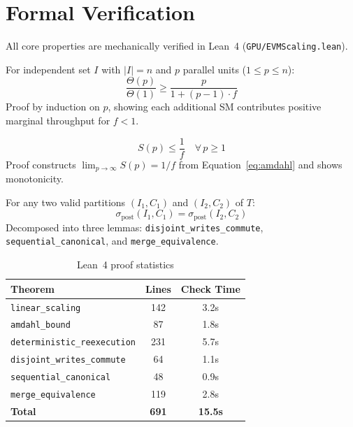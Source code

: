 \section{Formal Verification}

\label{sec:formal}

All core properties are mechanically verified in Lean~4 (\texttt{GPU/EVMScaling.lean}).

\begin{theorem}
\label{thm:formal-linear}
For independent set $I$ with $|I| = n$ and $p$ parallel units ($1 \leq p \leq n$):
\begin{equation}
\frac{\Theta(p)}{\Theta(1)} \geq \frac{p}{1 + (p-1) \cdot f}
\end{equation}
Proof by induction on $p$, showing each additional SM contributes positive marginal throughput for $f < 1$.
\end{theorem}

\begin{theorem}
\label{thm:formal-amdahl}
\begin{equation}
S(p) \leq \frac{1}{f} \quad \forall\, p \geq 1
\end{equation}
Proof constructs $\lim_{p \to \infty} S(p) = 1/f$ from Equation~\ref{eq:amdahl} and shows monotonicity.
\end{theorem}

\begin{theorem}
\label{thm:formal-deterministic}
For any two valid partitions $(I_1, C_1)$ and $(I_2, C_2)$ of $T$:
\begin{equation}
\sigma_{\text{post}}(I_1, C_1) = \sigma_{\text{post}}(I_2, C_2)
\end{equation}
Decomposed into three lemmas: \texttt{disjoint\_writes\_commute}, \texttt{sequential\_canonical}, and \texttt{merge\_equivalence}.
\end{theorem}

\begin{table}[h]
\centering
\begin{tabular}{lcc}
\toprule
\textbf{Theorem} & \textbf{Lines} & \textbf{Check Time} \\
\midrule
\texttt{linear\_scaling} & 142 & 3.2s \\
\texttt{amdahl\_bound} & 87 & 1.8s \\
\texttt{deterministic\_reexecution} & 231 & 5.7s \\
\texttt{disjoint\_writes\_commute} & 64 & 1.1s \\
\texttt{sequential\_canonical} & 48 & 0.9s \\
\texttt{merge\_equivalence} & 119 & 2.8s \\
\midrule
\textbf{Total} & \textbf{691} & \textbf{15.5s} \\
\bottomrule
\end{tabular}
\caption{Lean~4 proof statistics}
\label{tab:proofs}
\end{table}

